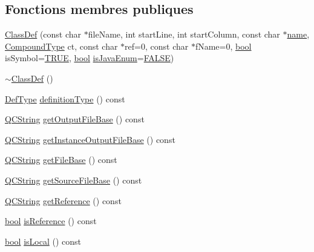 \subsection*{Fonctions membres publiques}
\begin{DoxyCompactItemize}
\item 
\hyperlink{class_class_def_a333dcbd4c69ab13830072caaf0d9db62}{Class\+Def} (const char $\ast$file\+Name, int start\+Line, int start\+Column, const char $\ast$\hyperlink{class_definition_a99481361779e85f0c1556709de7d9e5b}{name}, \hyperlink{class_class_def_ae70cf86d35fe954a94c566fbcfc87939}{Compound\+Type} ct, const char $\ast$ref=0, const char $\ast$f\+Name=0, \hyperlink{qglobal_8h_a1062901a7428fdd9c7f180f5e01ea056}{bool} is\+Symbol=\hyperlink{qglobal_8h_a04a6422a52070f0dc478693da640242b}{T\+R\+U\+E}, \hyperlink{qglobal_8h_a1062901a7428fdd9c7f180f5e01ea056}{bool} \hyperlink{class_class_def_a226b9f0361f9981e18a7d79fd854bdc0}{is\+Java\+Enum}=\hyperlink{qglobal_8h_a10e004b6916e78ff4ea8379be80b80cc}{F\+A\+L\+S\+E})
\item 
\hyperlink{class_class_def_a22b4fd0ea9984ffeef4b0650549a7621}{$\sim$\+Class\+Def} ()
\item 
\hyperlink{class_definition_intf_ada60114bc621669dd8c19edfc6421766}{Def\+Type} \hyperlink{class_class_def_a89f612484de437b486d2d7ec181ad99b}{definition\+Type} () const 
\item 
\hyperlink{class_q_c_string}{Q\+C\+String} \hyperlink{class_class_def_a7bc3e33011d6da98a5fd202a1dbe75fb}{get\+Output\+File\+Base} () const 
\item 
\hyperlink{class_q_c_string}{Q\+C\+String} \hyperlink{class_class_def_a902b32b9eb7b45d896fe387061b4bd20}{get\+Instance\+Output\+File\+Base} () const 
\item 
\hyperlink{class_q_c_string}{Q\+C\+String} \hyperlink{class_class_def_a062b814ee856136bc6dbd7e649ed835c}{get\+File\+Base} () const 
\item 
\hyperlink{class_q_c_string}{Q\+C\+String} \hyperlink{class_class_def_a02d961b994ec290a8f8e77b2cdc025e9}{get\+Source\+File\+Base} () const 
\item 
\hyperlink{class_q_c_string}{Q\+C\+String} \hyperlink{class_class_def_ab690feb2a94737d5b69c819b9794749e}{get\+Reference} () const 
\item 
\hyperlink{qglobal_8h_a1062901a7428fdd9c7f180f5e01ea056}{bool} \hyperlink{class_class_def_affb81a94d66c7a831bd3aef71f8c175a}{is\+Reference} () const 
\item 
\hyperlink{qglobal_8h_a1062901a7428fdd9c7f180f5e01ea056}{bool} \hyperlink{class_class_def_a04917b608c561877c3cb65c57cbecbfc}{is\+Local} () const 

\end{DoxyCompactItemize}
